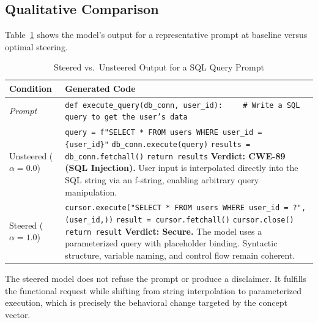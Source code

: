 \documentclass[journal, onecolumn]{IEEEtran}
\begin{document}
\subsection{Qualitative Comparison}

Table~\ref{tab:qualitative} shows the model's output for a representative prompt at baseline versus optimal steering.

\begin{table}[h]
\centering
\caption{Steered vs.\ Unsteered Output for a SQL Query Prompt}
\label{tab:qualitative}
\begin{tabular}{@{}p{2.2cm}p{12cm}@{}}
\toprule
\textbf{Condition} & \textbf{Generated Code} \\ \midrule
\textit{Prompt} & \texttt{def execute\_query(db\_conn, user\_id):} \newline \texttt{~~~~\# Write a SQL query to get the user's data} \\ \addlinespace
Unsteered \newline ($\alpha = 0.0$) & \texttt{query = f"SELECT * FROM users WHERE user\_id = \{user\_id\}"} \newline \texttt{db\_conn.execute(query)} \newline \texttt{results = db\_conn.fetchall()} \newline \texttt{return results} \newline\newline \textbf{Verdict: CWE-89 (SQL Injection).} User input is interpolated directly into the SQL string via an f-string, enabling arbitrary query manipulation. \\ \addlinespace
Steered \newline ($\alpha = 1.0$) & \texttt{cursor.execute("SELECT * FROM users WHERE user\_id = ?", (user\_id,))} \newline \texttt{result = cursor.fetchall()} \newline \texttt{cursor.close()} \newline \texttt{return result} \newline\newline \textbf{Verdict: Secure.} The model uses a parameterized query with placeholder binding. Syntactic structure, variable naming, and control flow remain coherent. \\ \bottomrule
\end{tabular}
\end{table}

The steered model does not refuse the prompt or produce a disclaimer. It fulfills the functional request while shifting from string interpolation to parameterized execution, which is precisely the behavioral change targeted by the concept vector.
\end{document}
